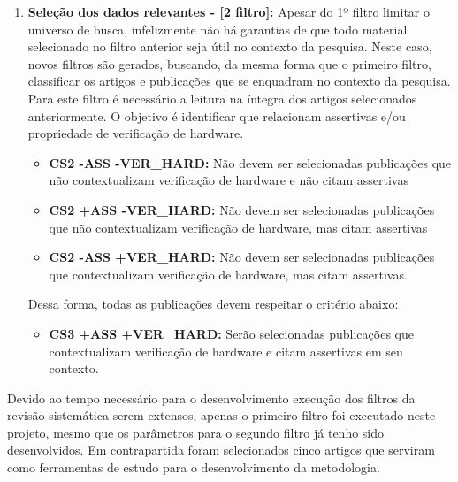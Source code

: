\begin{enumerate}
\item \textbf{Seleção dos dados relevantes - [2 filtro]:} Apesar do 1º filtro limitar o universo de busca, infelizmente não há garantias de que todo material selecionado no filtro anterior seja útil no contexto da pesquisa. Neste caso, novos filtros são gerados, buscando, da mesma forma que o primeiro filtro, classificar os artigos e publicações que se enquadram no contexto da pesquisa. Para este filtro é necessário a leitura na íntegra dos artigos selecionados anteriormente. O objetivo é identificar que relacionam assertivas e/ou propriedade de verificação de hardware.
    \begin{itemize}
    \item \textbf{CS2 -ASS -VER\_HARD:} Não devem ser selecionadas publicações que não contextualizam verificação de hardware e não citam assertivas
    \item \textbf{CS2 +ASS -VER\_HARD:} Não devem ser selecionadas publicações que não contextualizam verificação de hardware, mas citam assertivas
    \item \textbf{CS2 -ASS +VER\_HARD:} Não devem ser selecionadas publicações que contextualizam verificação de hardware, mas citam assertivas.
    \end{itemize}
Dessa forma, todas as publicações devem respeitar o critério abaixo:
	\begin{itemize}
	\item \textbf{CS3 +ASS +VER\_HARD:} Serão selecionadas publicações que contextualizam verificação de hardware e citam assertivas em seu contexto.
	\end{itemize}     	
\end{enumerate}

\par
Devido ao tempo necessário para o desenvolvimento execução dos filtros da revisão sistemática serem extensos, apenas o primeiro filtro foi executado neste projeto, mesmo que os parâmetros para o segundo filtro já tenho sido desenvolvidos. Em contrapartida foram selecionados cinco artigos que serviram como ferramentas de estudo para o desenvolvimento da metodologia.
